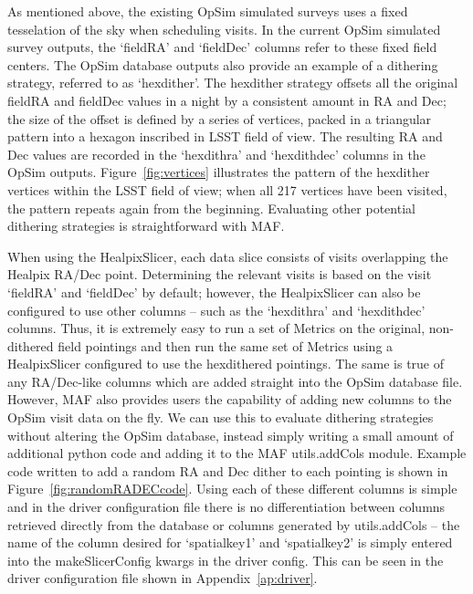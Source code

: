 \documentclass[]{spie}  %
\begin{document}
As mentioned above, the existing OpSim simulated surveys uses a fixed
tesselation of the sky when scheduling visits. In the current OpSim
simulated survey outputs, the `fieldRA' and `fieldDec' columns refer
to these fixed field centers. The OpSim database outputs also provide
an example of a dithering strategy, referred to as `hexdither'. The
hexdither strategy offsets all the original fieldRA and fieldDec
values in a night by a consistent amount in RA and Dec; the size of
the offset is defined by a series of vertices, packed in a triangular
pattern into a hexagon inscribed in LSST field of view.  The resulting
RA and Dec values are recorded in the `hexdithra' and `hexdithdec'
columns in the OpSim outputs.  Figure~\ref{fig:vertices} illustrates
the pattern of the hexdither vertices within the LSST field of view;
when all 217 vertices have been visited, the pattern repeats again
from the beginning.  Evaluating other potential dithering strategies is
straightforward with MAF.

When using the HealpixSlicer, each data slice consists of visits
overlapping the Healpix RA/Dec point. Determining the relevant visits
is based on the visit `fieldRA' and `fieldDec' by default; however,
the HealpixSlicer can also be configured to use other columns -- such
as the `hexdithra' and `hexdithdec' columns. Thus, it is extremely
easy to run a set of Metrics on the original, non-dithered field
pointings and then run the same set of Metrics using a HealpixSlicer
configured to use the hexdithered pointings. The same is true of any
RA/Dec-like columns which are added straight into the OpSim database
file. However, MAF also provides users the capability of adding new
columns to the OpSim visit data on the fly. We can use this to
evaluate dithering strategies without altering the OpSim database,
instead simply writing a small amount of additional python code and
adding it to the MAF utils.addCols module.  Example code written to
add a random RA and Dec dither to each pointing is shown in
Figure~\ref{fig:randomRADECcode}.  Using each of these different
columns is simple and in the driver configuration file there is no
differentiation between columns retrieved directly from the database
or columns generated by utils.addCols -- the name of the column
desired for `spatialkey1' and `spatialkey2' is simply entered into the
makeSlicerConfig kwargs in the driver config. This can be seen in the
driver configuration file shown in Appendix~\ref{ap:driver}.
\end{document}
